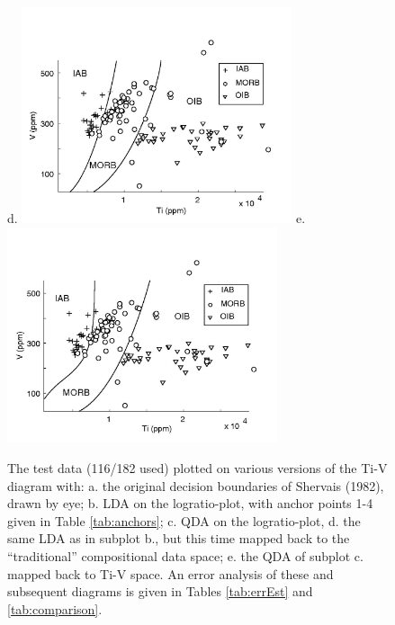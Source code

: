 \begin{figure}[htbp]
d.  \includegraphics[width=300]{figures/test_Ti_V_lin.jpg}
e.  \includegraphics[width=300]{figures/test_Ti_V_q.jpg}
  \caption[The test data plotted on various versions of the Ti-V diagram]
{The test data (116/182 used)  plotted on various versions of the Ti-V
diagram with: a. the  original decision boundaries of Shervais (1982),
drawn by  eye; b.   LDA on the  logratio-plot, with anchor  points 1-4
given in Table \ref{tab:anchors}; c.  QDA on the logratio-plot, d. the
same  LDA  as  in  subplot  b.,  but this  time  mapped  back  to  the
``traditional''  compositional  data space;  e.   the  QDA of  subplot
c.  mapped  back  to  Ti-V  space.  An error  analysis  of  these  and
subsequent   diagrams  is   given  in   Tables   \ref{tab:errEst}  and
\ref{tab:comparison}.}
  \label{fig:log_Ti_V}
\end{figure}

